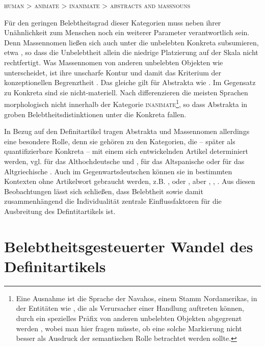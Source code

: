 \begin{exe}
	\ex \label{ex:einfachbelebt} \textsc{human > animate > inanimate  > abstracts and massnouns}
	\end{exe}
\noindent
Für den geringen Belebtheitsgrad dieser Kategorien muss neben ihrer Unähnlichkeit zum Menschen noch ein weiterer Parameter verantwortlich sein. Denn Massennomen   ließen sich auch unter die unbelebten Konkreta subsumieren, etwa , so dass die Unbelebtheit allein die niedrige Platzierung auf der Skala nicht rechtfertigt. Was Massennomen von anderen unbelebten Objekten wie  unterscheidet, ist ihre unscharfe Kontur und damit das Kriterium der konzeptionellen Begrenztheit \parencite[203ff.]{Langacker1987}. Das gleiche gilt für Abstrakta wie . Im Gegensatz zu Konkreta sind sie nicht-materiell. Nach \textcite[197]{Comrie1989} differenzieren die meisten Sprachen morphologisch nicht innerhalb der Kategorie \textsc{inanimate}\footnote{Eine Ausnahme ist die Sprache der Navahos, einem Stamm Nordamerikas, in der Entitäten wie , die als Verursacher einer Handlung auftreten können, durch ein spezielles Präfix von anderen unbelebten Objekten abgegrenzt  werden \parencite[197]{Comrie1989}, wobei man hier fragen müsste, ob eine solche Markierung nicht besser als Ausdruck der semantischen Rolle  \parencite[73]{Primus2012} betrachtet werden sollte.}, so dass Abstrakta in groben Belebtheitsdistinktionen unter die Konkreta fallen.

In Bezug auf den Definitartikel tragen Abstrakta und Massennomen allerdings eine besondere Rolle, denn sie gehören zu den Kategorien, die -- später als quantifizierbare Konkreta -- mit einem sich entwickelnden Artikel determiniert werden, vgl. für das Althochdeutsche \textcite{Oubouzar1992} und \textcite{Szczepaniak2011}, für das Altspanische \textcite{Company1991}  oder für das Altgriechische \textcite{Napoli2009}. Auch im Gegenwartsdeutschen können sie in bestimmten Kontexten ohne Artikelwort gebraucht werden, z.B. ,   oder  \parencite{DAvis2013}, aber , , . Aus diesen Beobachtungen lässt sich schließen, dass Belebtheit sowie damit zusammenhängend die Individualität zentrale Einflussfaktoren für die Ausbreitung des Defintitartikels ist. 

\section{Belebtheitsgesteuerter Wandel des Definitartikels}\label{sec:belebtwandel}

